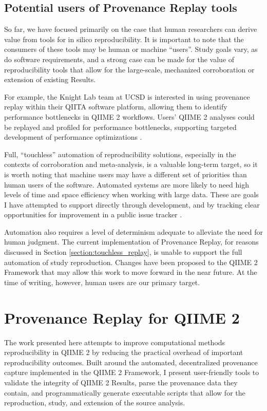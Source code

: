 \subsection{Potential users of Provenance Replay tools}
\label{potential_users}
So far, we have focused primarily on the case that human researchers can derive
value from tools for in silico reproducibility. It is important to note that the
consumers of these tools may be human or machine “users”. Study goals vary, as
do software requirements, and a strong case can be made for the value of
reproducibility tools that allow for the large-scale, mechanized corroboration
or extension of existing Results.

For example, the Knight Lab team at UCSD is interested in using provenance
replay within their QIITA software platform, allowing them to identify
performance bottlenecks in QIIME 2 workflows. Users' QIIME 2 analyses could be
replayed and profiled for performance bottlenecks, supporting targeted
development of performance optimizations \parencite{caporaso_nci_2022}.

Full, “touchless” automation of reproducibility solutions, especially in the
contexts of corroboration and meta-analysis, is a valuable long-term target, so
it is worth noting that machine users may have a different set of priorities
than human users of the software. Automated systems are more likely to need high
levels of time and space efficiency when working with large data. These are
goals I have attempted to support directly through development, and by tracking
clear opportunities for improvement in a public issue tracker \parencite[Issues 29,
60, 62]{keefe_issues_2021}.

Automation also requires a level of determinism adequate to alleviate the need
for human judgment. The current implementation of Provenance Replay, for reasons
discussed in Section \ref{section:touchless_replay}, is unable to support the
full automation of study reproduction. Changes have been proposed to the QIIME 2
Framework that may allow this work to move forward in the near future. At the
time of writing, however, human users are our primary target.


\section{Provenance Replay for QIIME 2}

The work presented here attempts to improve computational methods
reproducibility in QIIME 2 by reducing the practical overhead of important
reproducibility outcomes. Built around the automated, decentralized provenance
capture implemented in the QIIME 2 Framework, I present user-friendly tools to
validate the integrity of QIIME 2 Results, parse the provenance data they
contain, and programmatically generate executable scripts that allow for the
reproduction, study, and extension of the source analysis.

